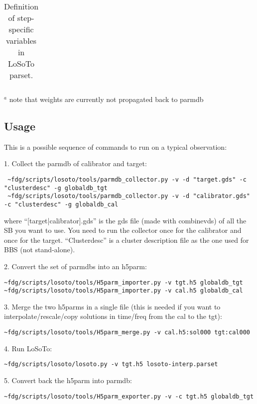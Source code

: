 \documentclass[structabstract]{article}
\begin{document}
\begin{table}[!ht]
\begin{tabular}{l l l l}
\hline

\end{tabular}
$^a$ note that weights are currently not propagated back to parmdb
\caption{Definition of step-specific variables in LoSoTo parset. \label{losoto:tab:local_val}}
\end{table}

\subsection{Usage}
\label{losoto:usage}

This is a possible sequence of commands to run \losoto{} on a typical observation:

1. Collect the parmdb of calibrator and target:
\begin{verbatim}
 ~fdg/scripts/losoto/tools/parmdb_collector.py -v -d "target.gds" -c "clusterdesc" -g globaldb_tgt
 ~fdg/scripts/losoto/tools/parmdb_collector.py -v -d "calibrator.gds" -c "clusterdesc" -g globaldb_cal
\end{verbatim}
where ``[target|calibrator].gds'' is the gds file (made with combinevds) of all the SB you want to use. You need to run the collector once for the calibrator and once for the target. ``Clusterdesc'' is a cluster description file as the one used for BBS (not stand-alone).

2. Convert the set of parmdbs into an h5parm:
\begin{verbatim}
~fdg/scripts/losoto/tools/H5parm_importer.py -v tgt.h5 globaldb_tgt
~fdg/scripts/losoto/tools/H5parm_importer.py -v cal.h5 globaldb_cal
\end{verbatim}

3. Merge the two h5parms in a single file (this is needed if you want to interpolate/rescale/copy solutions in time/freq from the cal to the tgt):
\begin{verbatim}
~fdg/scripts/losoto/tools/H5parm_merge.py -v cal.h5:sol000 tgt:cal000
\end{verbatim}

4. Run LoSoTo:
\begin{verbatim}
~fdg/scripts/losoto/losoto.py -v tgt.h5 losoto-interp.parset
\end{verbatim}

5. Convert back the h5parm into parmdb:
\begin{verbatim}
~fdg/scripts/losoto/tools/H5parm_exporter.py -v -c tgt.h5 globaldb_tgt
\end{verbatim}
\end{document}
